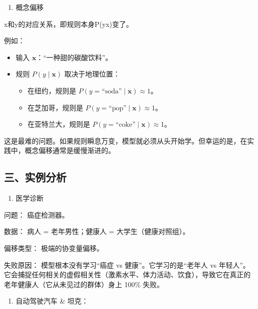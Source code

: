 \begin{enumerate}
\def\labelenumi{\arabic{enumi}.}
\setcounter{enumi}{2}
\tightlist
\item
  概念偏移
\end{enumerate}

x和y的对应关系，即规则本身P(y\textbar x)变了。

例如：

\begin{itemize}
\tightlist
\item
  输入 \(\mathbf{x}\)：``一种甜的碳酸饮料''。
\item
  规则 \(P(y\mid\mathbf{x})\) 取决于地理位置：

  \begin{itemize}
  \tightlist
  \item
    在纽约，规则是 \(P(y=\text{“soda”}\mid\mathbf{x})\approx 1\)。
  \item
    在芝加哥，规则是 \(P(y=\text{“pop”}\mid\mathbf{x})\approx 1\)。
  \item
    在亚特兰大，规则是 \(P(y=\text{“coke”}\mid\mathbf{x})\approx 1\)。
  \end{itemize}
\end{itemize}

这是最难的问题。如果规则瞬息万变，模型就必须从头开始学。但幸运的是，在实践中，概念偏移通常是缓慢渐进的。

\hypertarget{ux4e09ux5b9eux4f8bux5206ux6790}{%
\subsection{三、实例分析}\label{ux4e09ux5b9eux4f8bux5206ux6790}}

\begin{enumerate}
\def\labelenumi{\arabic{enumi}.}
\tightlist
\item
  医学诊断
\end{enumerate}

问题： 癌症检测器。

数据： 病人 = 老年男性；健康人 = 大学生（健康对照组）。

偏移类型： 极端的协变量偏移。

失败原因： 模型根本没有学习``癌症 vs 健康''。它学习的是``老年人 vs 年轻人''。它会捕捉任何相关的虚假相关性（激素水平、体力活动、饮食），导致它在真正的老年健康人（它从未见过的群体）身上 100\% 失败。

\begin{enumerate}
\def\labelenumi{\arabic{enumi}.}
\setcounter{enumi}{1}
\tightlist
\item
  自动驾驶汽车 \& 坦克：
\end{enumerate}

